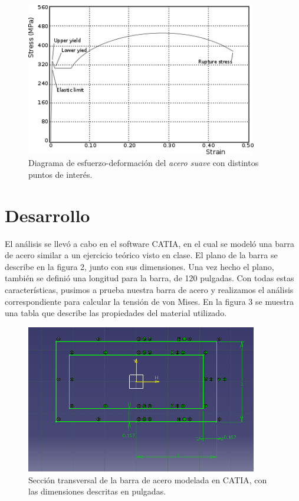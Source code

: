 \documentclass[12pt, letterpaper]{article}
\begin{document}
\begin{figure}[H]
	\centering
	\includegraphics[width=0.9\textwidth]{ssdiagramsteel.png}
	\caption{Diagrama de esfuerzo-deformación del \textit{acero suave} con distintos puntos de interés.}
\end{figure}

\section*{Desarrollo}

El análisis se llevó a cabo en el software CATIA, en el cual se modeló una barra de acero similar a un ejercicio teórico visto en clase. El plano de la barra se describe en la figura 2, junto con sus dimensiones. Una vez hecho el plano, también se definió una longitud para la barra, de 120 pulgadas. Con todas estas características, pusimos a prueba nuestra barra de acero y realizamos el análisis correspondiente para calcular la tensión de von Mises. En la figura 3 se muestra una tabla que describe las propiedades del material utilizado.

\begin{figure}[H]
	\centering
	\includegraphics[width=0.9\textwidth]{dimensions.png}
	\caption{Sección transversal de la barra de acero modelada en CATIA, con las dimensiones descritas en pulgadas.}
\end{figure}
\end{document}
